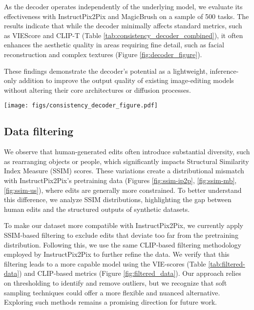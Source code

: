 As the decoder operates independently of the underlying model, we evaluate its effectiveness with InstructPix2Pix\cite{brooks2023instructpix2pix} and MagicBrush\cite{zhang2024magicbrush} on a sample of 500 tasks. The results indicate that while the decoder minimally affects standard metrics, such as VIEScore\cite{ku2023viescore} and CLIP-T (Table \ref{tab:consistency_decoder_combined}), it often enhances the aesthetic quality in areas requiring fine detail, such as facial reconstruction and complex textures (Figure \ref{fig:decoder_figure}).

These findings demonstrate the decoder’s potential as a lightweight, inference-only addition to improve the output quality of existing image-editing models without altering their core architectures or diffusion processes.


\begin{figure*}[t]
    \centering
    \texttt{[image: figs/consistency\_decoder\_figure.pdf]}
    \caption{Consistency decoder allows for more aesthetic generation of faces.}
    \label{fig:decoder_figure}
\end{figure*}


\subsection{Data filtering}

We observe that human-generated edits often introduce substantial diversity, such as rearranging objects or people, which significantly impacts Structural Similarity Index Measure (SSIM) scores. These variations create a distributional mismatch with InstructPix2Pix’s pretraining data (Figures \ref{fig:ssim-ip2p}, \ref{fig:ssim-mb}, \ref{fig:ssim-us}), where edits are generally more constrained. To better understand this difference, we analyze SSIM distributions, highlighting the gap between human edits and the structured outputs of synthetic datasets.

To make our dataset more compatible with InstructPix2Pix, we currently apply SSIM-based filtering to exclude edits that deviate too far from the pretraining distribution. Following this, we use the same CLIP-based filtering methodology employed by InstructPix2Pix to further refine the data. We verify that this filtering leads to a more capable model using the VIE-scores (Table \ref{tab:filtered-data}) and CLIP-based metrics (Figure \ref{fig:filtered_data}). Our approach relies on thresholding to identify and remove outliers, but we recognize that soft sampling techniques could offer a more flexible and nuanced alternative. Exploring such methods remains a promising direction for future work.

